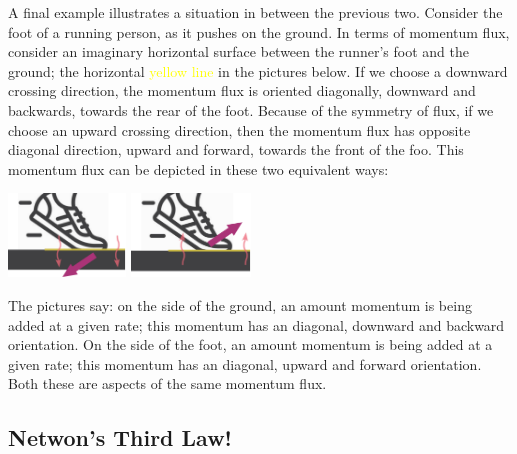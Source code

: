 \documentclass[a4paper,12pt,%
onecolumn,oneside,%
british%
]{memoir}
\renewcommand*{\|}[1][]{\nonscript\:#1\vert\nonscript\:\mathopen{}}
\begin{document}
A final example illustrates a situation in between the previous two. Consider the foot of a running person, as it pushes on the ground. In terms of momentum flux, consider an imaginary horizontal surface between the runner's foot and the ground; the horizontal \textcolor{yellow}{yellow line} in the pictures below. If we choose a downward crossing direction, the momentum flux is oriented diagonally, downward and backwards, towards the rear of the foot. Because of the symmetry of flux, if we choose an upward crossing direction, then the momentum flux has opposite diagonal direction, upward and forward, towards the front of the foo. This momentum flux can be depicted in these two equivalent ways:\noprelistbreak
\begin{center}
  \medskip
\hspace*{\fill}
  \includegraphics[height=6em]{images/foot_shear_flux_down.pdf}
\hfill
  \includegraphics[height=6em]{images/foot_shear_flux_up.pdf}
\hspace*{\fill}
\end{center}
The pictures say: on the side of the ground, an amount momentum is being added at a given rate; this momentum has an diagonal, downward and backward orientation. On the side of the foot, an amount momentum is being added at a given rate; this momentum has an diagonal, upward and forward orientation. Both these are aspects of the same momentum flux.

\subsection{Netwon's Third Law!}
\label{sec:newton_3rd}
\end{document}
